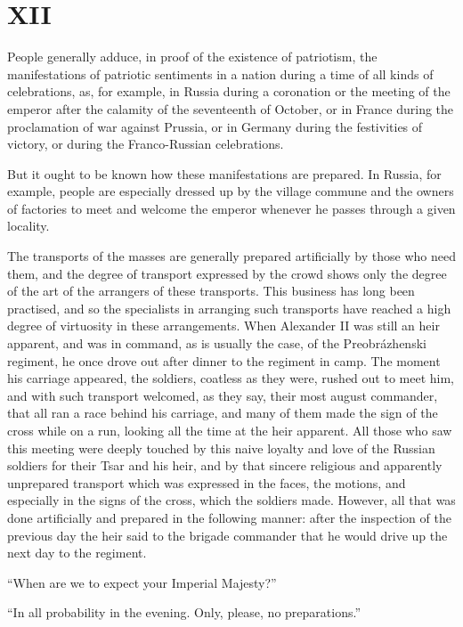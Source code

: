 \documentclass{book}
\begin{document}
\chapter{XII}
\label{chapter-12}
People generally adduce, in proof of the existence of patriotism, the manifestations of patriotic sentiments in a nation during a time of all kinds of celebrations, as, for example, in Russia during a coronation or the meeting of the emperor after the calamity of the seventeenth of October, or in France during the proclamation of war against Prussia, or in Germany during the festivities of victory, or during the Franco-Russian celebrations.

But it ought to be known how these manifestations are prepared. In Russia, for example, people are especially dressed up by the village commune and the owners of factories to meet and welcome the emperor whenever he passes through a given locality.

The transports of the masses are generally prepared artificially by those who need them, and the degree of transport expressed by the crowd shows only the degree of the art of the arrangers of these transports. This business has long been practised, and so the specialists in arranging such transports have reached a high degree of virtuosity in these arrangements. When Alexander II was still an heir apparent, and was in command, as is usually the case, of the Preobrázhenski regiment, he once drove out after dinner to the regiment in camp. The moment his carriage appeared, the soldiers, coatless as they were, rushed out to meet him, and with such transport welcomed, as they say, their most august commander, that all ran a race behind his carriage, and many of them made the sign of the cross while on a run, looking all the time at the heir apparent. All those who saw this meeting were deeply touched by this naive loyalty and love of the Russian soldiers for their Tsar and his heir, and by that sincere religious and apparently unprepared transport which was expressed in the faces, the motions, and especially in the signs of the cross, which the soldiers made. However, all that was done artificially and prepared in the following manner: after the inspection of the previous day the heir said to the brigade commander that he would drive up the next day to the regiment.

“When are we to expect your Imperial Majesty?”

“In all probability in the evening. Only, please, no preparations.”
\end{document}
